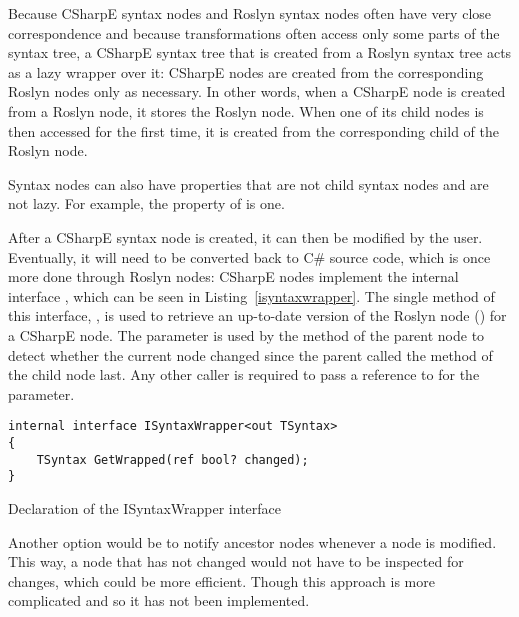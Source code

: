 \medskip

Because CSharpE syntax nodes and Roslyn syntax nodes often have very close correspondence and because transformations often access only some parts of the syntax tree, a CSharpE syntax tree that is created from a Roslyn syntax tree acts as a lazy wrapper over it: CSharpE nodes are created from the corresponding Roslyn nodes only as necessary. In other words, when a CSharpE node is created from a Roslyn node, it stores the Roslyn node. When one of its child nodes is then accessed for the first time, it is created from the corresponding child of the Roslyn node.

Syntax nodes can also have properties that are not child syntax nodes and are not lazy. For example, the property  of  is one.

\medskip

After a CSharpE syntax node is created, it can then be modified by the user. Eventually, it will need to be converted back to C\# source code, which is once more done through Roslyn nodes: CSharpE nodes implement the internal interface , which can be seen in Listing~\ref{isyntaxwrapper}. The single method of this interface, , is used to retrieve an up-to-date version of the Roslyn node () for a CSharpE node. The  parameter is used by the  method of the parent node to detect whether the current node changed since the parent called the  method of the child node last. Any other caller is required to pass a reference to  for the parameter.

\begin{listing}
\begin{verbatim}
internal interface ISyntaxWrapper<out TSyntax>
{
    TSyntax GetWrapped(ref bool? changed);
}
\end{verbatim}
\caption{Declaration of the ISyntaxWrapper interface}
\label{isyntaxwrapper}
\end{listing}

Another option would be to notify ancestor nodes whenever a node is modified. This way, a node that has not changed would not have to be inspected for changes, which could be more efficient. Though this approach is more complicated and so it has not been implemented.

\medskip


